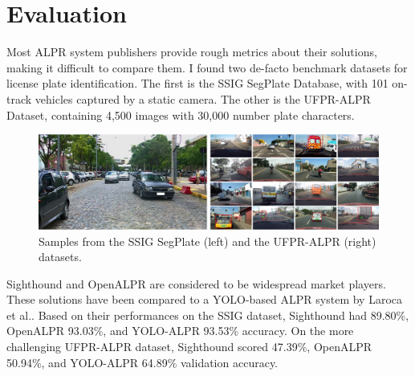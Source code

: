 \section{Evaluation}

Most ALPR system publishers provide rough metrics about their solutions, making it difficult to compare them. I found two de-facto benchmark datasets for license plate identification. The first is the SSIG SegPlate Database\cite{SSIG-ALPR}, with 101 on-track vehicles captured by a static camera. The other is the UFPR-ALPR Dataset\cite{UFPR-ALPR}, containing 4,500 images with 30,000 number plate characters.

\begin{figure}[htb]
 \centerline{\includegraphics[width=1.0\columnwidth]{.//Figure/ALPR/alpr-datasets.png}}
 \caption{Samples from the SSIG SegPlate\cite{SSIG-ALPR} (left) and the UFPR-ALPR\cite{UFPR-ALPR} (right) datasets.}
 \label{fig:alpr-datasets}
\end{figure}

Sighthound\cite{Sighthound} and OpenALPR\cite{OpenALPR} are considered to be widespread market players. These solutions have been compared to a YOLO-based ALPR system by Laroca et al.\cite{RobustRealTimeALPR_YOLO}. Based on their performances on the SSIG dataset, Sighthound had 89.80\%, OpenALPR 93.03\%, and YOLO-ALPR 93.53\% accuracy. On the more challenging UFPR-ALPR dataset, Sighthound scored 47.39\%, OpenALPR 50.94\%, and YOLO-ALPR 64.89\% validation accuracy.


